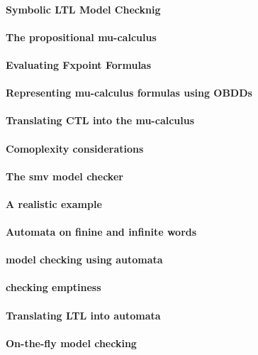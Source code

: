 \paragraph{Symbolic LTL Model Checknig}
\paragraph{The propositional mu-calculus}
\paragraph{Evaluating Fxpoint Formulas}
\paragraph{Representing mu-calculus formulas using OBDDs}
\paragraph{Translating CTL into the mu-calculus}
\paragraph{Comoplexity considerations}
\paragraph{The smv model checker}
\paragraph{A realistic example}
\paragraph{Automata on finine and infinite words}
\paragraph{model checking using automata}
\paragraph{checking emptiness}
\paragraph{Translating LTL into automata}
\paragraph{On-the-fly model checking}
